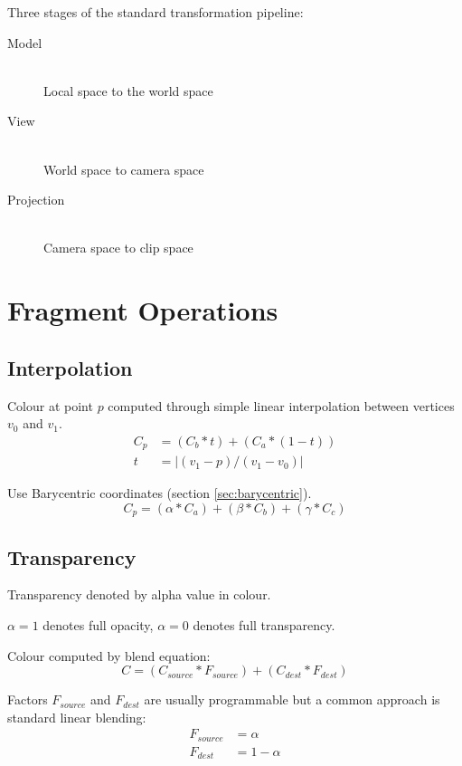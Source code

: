\documentclass[a4paper]{article}
\begin{document}
Three stages of the standard transformation pipeline:

\begin{description}
  \item[Model] \hfill \\
    Local space to the world space

  \item[View] \hfill \\
    World space to camera space

  \item[Projection] \hfill \\
    Camera space to clip space

\end{description}

\section{Fragment Operations}
\label{sec:fragment_operations}

\subsection{Interpolation}


Colour at point $p$ computed through simple linear interpolation between
vertices $v_{0}$ and $v_{1}$.
\begin{align*}
  C_{p} &= (C_{b} * t) + (C_{a} * (1 - t)) \\
      t &= |(v_{1} - p) / (v_{1} - v_{0})|
\end{align*}


Use Barycentric coordinates (section \ref{sec:barycentric}).
\[
  C_{p} = (\alpha * C_{a}) + (\beta * C_{b}) + (\gamma * C_{c})
\]

\subsection{Transparency}

Transparency denoted by alpha value in colour.

$\alpha = 1$ denotes full opacity, $\alpha = 0$ denotes full transparency.

Colour computed by blend equation:
\[
  C = (C_{source} * F_{source}) + (C_{dest} * F_{dest})
\]

Factors $F_{source}$ and $F_{dest}$ are usually programmable but a common
approach is standard linear blending:
\begin{align*}
  F_{source} &= \alpha \\
    F_{dest} &= 1 - \alpha
\end{align*}
\end{document}
